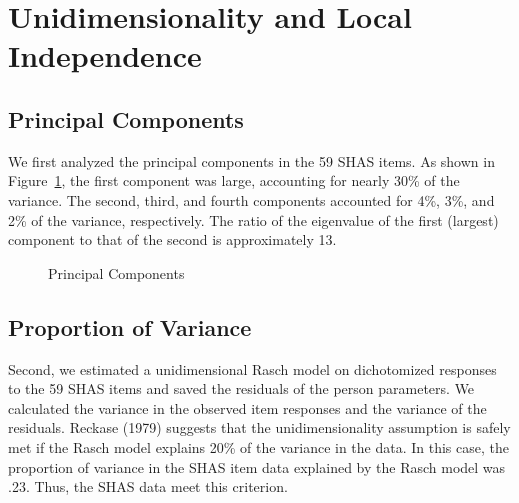 \documentclass[
  letterpaper,
]{article}
\begin{document}
\section*{Unidimensionality and Local
Independence}\label{unidimensionality-and-local-independence}


\subsection*{Principal Components}\label{principal-components}

We first analyzed the principal components in the 59 SHAS items. As
shown in Figure~\ref{fig-pca}, the first component was large, accounting
for nearly 30\% of the variance. The second, third, and fourth
components accounted for 4\%, 3\%, and 2\% of the variance,
respectively. The ratio of the eigenvalue of the first (largest)
component to that of the second is approximately 13.

\begin{figure}


\caption{\label{fig-pca}Principal Components}

\end{figure}%

\subsection*{Proportion of Variance}\label{proportion-of-variance}

Second, we estimated a unidimensional Rasch model on dichotomized
responses to the 59 SHAS items and saved the residuals of the person
parameters. We calculated the variance in the observed item responses
and the variance of the residuals. Reckase (1979) suggests that the
unidimensionality assumption is safely met if the Rasch model explains
20\% of the variance in the data. In this case, the proportion of
variance in the SHAS item data explained by the Rasch model was .23.
Thus, the SHAS data meet this criterion.
\end{document}
